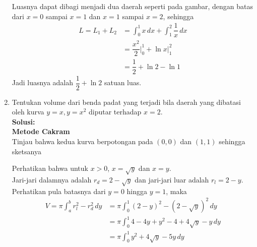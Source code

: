 \documentclass{article}
\begin{document}
\begin{enumerate}
\begin{center}
		\end{center}
		Luasnya dapat dibagi menjadi dua daerah seperti pada gambar, dengan batas dari $x=0$ sampai $x=1$ dan $x=1$ sampai $x=2$, sehingga
		\begin{align*}
		L = L_1 + L_2 &= \int_0^1 x \, dx +\int_1^2 \dfrac{1}{x} \, dx\\
		&= \dfrac{x^2}{2}\bigg|^1_0 + \ln x|^2_1\\
		&= \dfrac{1}{2} + \ln 2-\ln 1
		\end{align*}
Jadi luasnya adalah $\dfrac{1}{2}+\ln 2$ satuan luas.
	\item Tentukan volume dari benda padat yang terjadi bila daerah yang dibatasi oleh kurva $y=x, y=x^2$ diputar terhadap $x=2$.\\
	\textbf{Solusi:}\\
	\textbf{Metode Cakram}\\
	Tinjau bahwa kedua kurva berpotongan pada $(0,0)$ dan $(1,1)$ sehingga sketsanya 
	\begin{center}
		\end{center}
		Perhatikan bahwa untuk $x>0$, $x=\sqrt{y}$ dan $x=y$.\\
		Jari-jari dalamnya adalah $r_d=2-\sqrt{y}$ dan jari-jari luar adalah $r_l=2-y$. Perhatikan pula batasnya dari $y=0$ hingga $y=1$, maka
		\begin{align*}
		V = \pi \int_a^b r_l^2-r_d^2\, dy &= \pi \int_0^1 (2-y)^2-(2-\sqrt{y})^2\, dy\\
		&= \pi \int_0^1 4-4y+y^2-4+4\sqrt{y}-y\, dy\\
		&= \pi \int_0^1 y^2+4\sqrt{y}-5y\, dy\\

\end{align*}
\end{enumerate}
\end{document}
